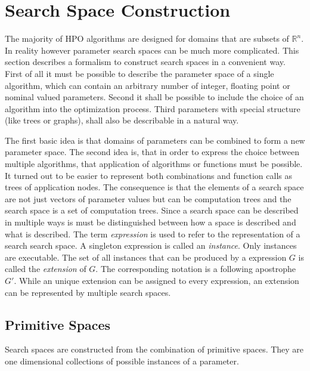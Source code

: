 \documentclass[english]{article}
\begin{document}
\newpage


\section{Search Space Construction}
\label{construction}
The majority of HPO algorithms are designed for domains that are subsets of $\mathbb{R}^n$. In reality however parameter search spaces can be much more complicated. This section describes a formalism to construct search spaces in a convenient way. First of all it must be possible to describe the parameter space of a single algorithm, which can contain an arbitrary number of integer, floating point or nominal valued parameters. Second it shall be possible to include the choice of an algorithm into the optimization process. Third parameters with special structure (like trees or graphs), shall also be describable in a natural way.

The first basic idea is that domains of parameters can be combined to form a new parameter space. The second idea is, that in order to express the choice between multiple algorithms, that application of algorithms or functions must be possible. It turned out to be easier to represent both combinations and function calls as trees of application nodes.
The consequence is that the elements of a search space are not just vectors of parameter values but can be computation trees and the search space is a set of computation trees.
Since a search space can be described in multiple ways is must be distinguished between how a space is described and what is described. The term \textit{expression} is used to refer to the representation of a search search space. A singleton expression is called an \textit{instance}. Only instances are executable. The set of all instances that can be produced by a expression $G$ is called the \textit{extension} of $G$. The corresponding notation is a following apostrophe $G'$. While an unique extension can be assigned to every expression, an extension can be represented by multiple search spaces.

\subsection{Primitive Spaces}

Search spaces are constructed from the combination of primitive spaces. They are one dimensional collections of possible instances of a parameter.

\end{document}
